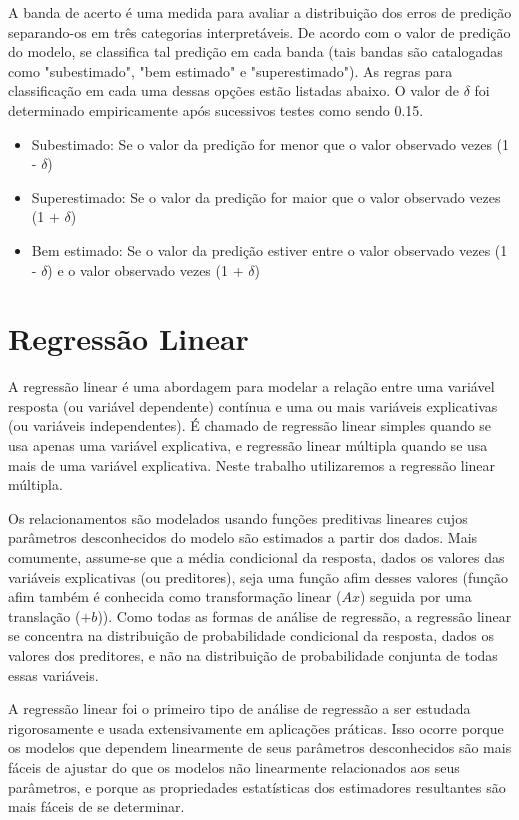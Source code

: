 A banda de acerto é uma medida para avaliar a distribuição dos erros de predição separando-os em três categorias interpretáveis. De acordo com o valor de predição do modelo, se classifica tal predição em cada banda (tais bandas são catalogadas como "subestimado", "bem estimado" e "superestimado"). As regras para classificação em cada uma dessas opções estão listadas abaixo. O valor de $ \delta $ foi determinado empiricamente após sucessivos testes como sendo 0.15.

\begin{itemize}
	\item Subestimado: Se o valor da predição for menor que o valor observado vezes (1 - $ \delta $)
	\item Superestimado: Se o valor da predição for maior que o valor observado vezes (1 + $ \delta $)
	\item Bem estimado: Se o valor da predição estiver entre o valor observado vezes (1 - $ \delta $) e o valor observado vezes (1 + $ \delta $)
\end{itemize}

\section{Regressão Linear}
\label{sec:regressao_linear}

A regressão linear é uma abordagem para modelar a relação entre uma variável resposta (ou variável dependente) contínua e uma ou mais variáveis ​​explicativas (ou variáveis ​​independentes). É chamado de regressão linear simples quando se usa apenas uma variável explicativa, e regressão linear múltipla quando se usa mais de uma variável explicativa. Neste trabalho utilizaremos a regressão linear múltipla.

Os relacionamentos são modelados usando funções preditivas lineares cujos parâmetros desconhecidos do modelo são estimados a partir dos dados. Mais comumente, assume-se que a média condicional da resposta, dados os valores das variáveis ​​explicativas (ou preditores), seja uma função afim desses valores (função afim também é conhecida como transformação linear ($ Ax $) seguida por uma translação ($ +b $)). Como todas as formas de análise de regressão, a regressão linear se concentra na distribuição de probabilidade condicional da resposta, dados os valores dos preditores, e não na distribuição de probabilidade conjunta de todas essas variáveis.

A regressão linear foi o primeiro tipo de análise de regressão a ser estudada rigorosamente e usada extensivamente em aplicações práticas. Isso ocorre porque os modelos que dependem linearmente de seus parâmetros desconhecidos são mais fáceis de ajustar do que os modelos não linearmente relacionados aos seus parâmetros, e porque as propriedades estatísticas dos estimadores resultantes são mais fáceis de se determinar.

